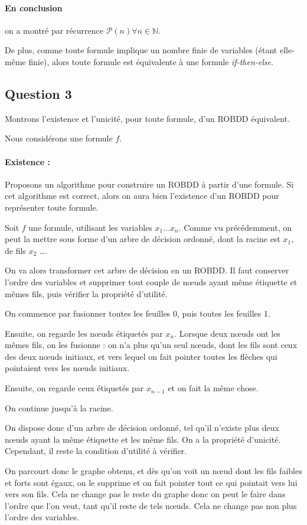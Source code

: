 \documentclass[12pt]{article}
\def\question#1{\subsection*{Question #1}}
\def\ite{\textit{if-then-else}}
\def\P{\mathcal{P}}
\begin{document}
\paragraph{En conclusion} on a montré par récurrence $\P (n)\forall n\in\mathbb{N}$.

De plus, comme toute formule implique un nombre finie de variables (étant elle-même finie), alors toute formule est équivalente à une formule \ite.

\question{3}
Montrons l'existence et l'unicité, pour toute formule, d'un ROBDD équivalent.

Nous considérons une formule $f$.
\paragraph{Existence :}
Proposons un algorithme pour construire un ROBDD à partir d'une formule. Si cet algorithme est correct, alors on aura bien l'existence d'un ROBDD pour représenter toute formule.

Soit $f$ une formule, utilisant les variables $x_1\dots x_n$. Comme vu précédemment, on peut la mettre sous forme d'un arbre de décision ordonné, dont la racine est $x_1$, de fils $x_2$ \dots.

On va alors transformer cet arbre de décision en un ROBDD. Il faut conserver l'ordre des variables et supprimer tout couple de n\oe uds ayant même étiquette et mêmes fils, puis vérifier la propriété d'utilité.

On commence par fusionner toutes les feuilles 0, puis toutes les feuilles 1.

Ensuite, on regarde les n\oe uds étiquetés par $x_n$. Lorsque deux n\oe uds ont les mêmes fils, on les fusionne : on n'a plus qu'un seul n\oe uds, dont les fils sont ceux des deux n\oe uds initiaux, et vers lequel on fait pointer toutes les flèches qui pointaient vers les n\oe uds initiaux.

Ensuite, on regarde ceux étiquetés par $x_{n-1}$ et on fait la même chose.

On continue jusqu'à la racine.

On dispose donc d'un arbre de décision ordonné, tel qu'il n'existe plus deux n\oe uds ayant la même étiquette et les même fils. On a la propriété d'unicité. Cependant, il reste la condition d'utilité à vérifier.

On parcourt donc le graphe obtenu, et dès qu'on voit un n\oe ud dont les fils faibles et forts sont égaux, on le supprime et on fait pointer tout ce qui pointait vers lui vers son fils. Cela ne change pas le reste du graphe donc on peut le faire dans l'ordre que l'on veut, tant qu'il reste de tels n\oe uds. Cela ne change pas non plus l'ordre des variables.
\end{document}
